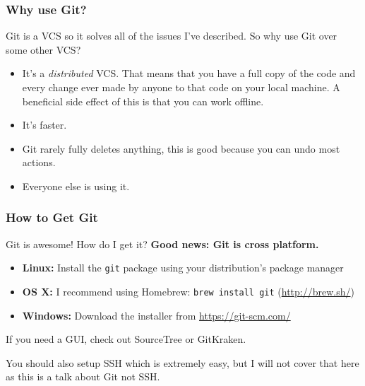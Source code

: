 \documentclass{lug}
\begin{document}
\begin{frame}
    \frametitle{Why use Git?}

    Git is a VCS so it solves all of the issues I've described. So why use Git
    over some other VCS?\footnotemark

    \begin{itemize}[<+->]
        \item It's a \textit{distributed} VCS. That means that you have a full
            copy of the code and every change ever made by anyone to that code
            on your local machine. A beneficial side effect of this is that you
            can work offline.
        \item It's faster.
        \item Git rarely fully deletes anything, this is good because you can
            undo most actions.
        \item Everyone else is using it.
    \end{itemize}

\end{frame}

\begin{frame}
    \frametitle{How to Get Git}

    Git is awesome! How do I get it? \textbf{Good news: Git is cross platform.}

    \begin{itemize}
        \item \textbf{Linux:} Install the \texttt{git} package using your
            distribution's package manager
        \item \textbf{OS X:} I recommend using Homebrew: \texttt{brew install git}
            (\url{http://brew.sh/})
        \item \textbf{Windows:} Download the installer from \url{https://git-scm.com/}
    \end{itemize}

    If you need a GUI, check out SourceTree or GitKraken.

    You should also setup SSH which is extremely easy, but I will not cover that
    here as this is a talk about Git not SSH.
\end{frame}
\end{document}
